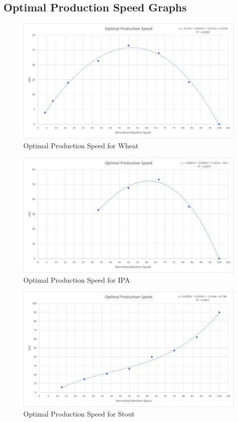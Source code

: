 \subsection{Optimal Production Speed Graphs}\label{app:ops_graphs}

\begin{figure}[H]
	\centering
	\includegraphics[width=1\linewidth]{images/ops/wheat.png}
	\caption{Optimal Production Speed for Wheat}
\end{figure}

\begin{figure}[H]
	\centering
	\includegraphics[width=1\linewidth]{images/ops/ipa.png}
	\caption{Optimal Production Speed for IPA}
\end{figure}

\begin{figure}[H]
	\centering
	\includegraphics[width=1\linewidth]{images/ops/stout.png}
	\caption{Optimal Production Speed for Stout}
\end{figure}

